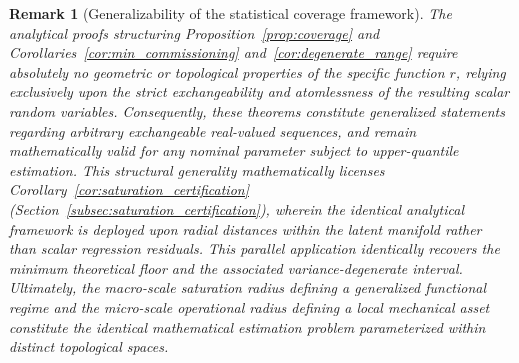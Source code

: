 \documentclass[a4paper]{cas-sc}
\newtheorem{remark}{Remark}
\newcommand{\residual}{\ensuremath{r}}
\begin{document}
\begin{remark}[Generalizability of the statistical coverage framework]
\label{rem:saturation_link}
The analytical proofs structuring Proposition~\ref{prop:coverage} and Corollaries~\ref{cor:min_commissioning} and~\ref{cor:degenerate_range} require absolutely no geometric or topological properties of the specific function \(\residual\), relying exclusively upon the strict exchangeability and atomlessness of the resulting scalar random variables. Consequently, these theorems constitute generalized statements regarding arbitrary exchangeable real-valued sequences, and remain mathematically valid for any nominal parameter subject to upper-quantile estimation. This structural generality mathematically licenses Corollary~\ref{cor:saturation_certification} (Section~\ref{subsec:saturation_certification}), wherein the identical analytical framework is deployed upon radial distances within the latent manifold rather than scalar regression residuals. This parallel application identically recovers the minimum theoretical floor and the associated variance-degenerate interval. Ultimately, the macro-scale saturation radius defining a generalized functional regime and the micro-scale operational radius defining a local mechanical asset constitute the identical mathematical estimation problem parameterized within distinct topological spaces.
\end{remark}
\end{document}

